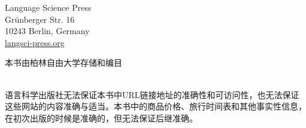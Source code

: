 {\bigskip

Language Science Press\\
Grünberger Str. 16\\
10243 Berlin, Germany\\
\href{http://langsci-press.org}{langsci-press.org}

\vfill

本书由柏林自由大学存储和编目 \\[3ex]

\\[3ex]

\vfill

\noindent
语言科学出版社无法保证本书中URL链接地址的准确性和可访问性，也无法保证这些网站的内容准确与适当。本书中的商品价格、旅行时间表和其他事实性信息，在初次出版的时候是准确的，但无法保证后继准确。
}


\makeatother



\newcommand{\mytrans}[1]{\trans\quotetrans{#1}}

\newcommand{\quotetrans}[1]{‘#1’}







